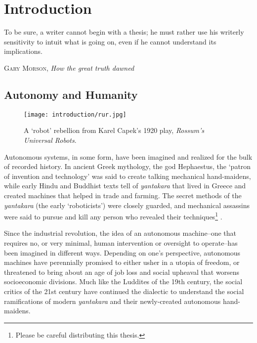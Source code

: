 \chapter{Introduction}
\label{ch:intro}
\epigraph{To be sure, a writer cannot begin with a thesis; he must rather use his writerly sensitivity to intuit what is going on, even if he cannot understand its implications.}{\textsc{Gary Morson}, \textit{How the great truth dawned}}
 

\section{Autonomy and Humanity}
\begin{wrapfigure}{r}{0.5\textwidth}
  \begin{center}
  	\vspace{-20pt}
    \texttt{[image: introduction/rur.jpg]}
     \vspace{-15pt}
  \end{center}
  \caption{A `robot' rebellion from Karel Capek's 1920 play, \textit{Rossum's Universal Robots}.}
  \vspace{-5pt}
  \label{fig:into_rur}
\end{wrapfigure}

Autonomous systems, in some form, have been imagined and realized for the bulk of recorded history. In ancient Greek mythology, the god Hephaestus, the `patron of invention and technology' \citep{MayorGodsRobots2019} was said to create talking mechanical hand-maidens, while early Hindu and Buddhist texts tell of \textit{yantakara} that lived in Greece and created machines that helped in trade and farming. The secret methods of the \textit{yantakara} (the early `roboticists') were closely guarded, and mechanical assassins were said to pursue and kill any person who revealed their techniques\footnote{Please be careful distributing this thesis.} \citep{MayorGodsRobots2019}. 


Since the industrial revolution, the idea of an autonomous machine--one that requires no, or very minimal, human intervention or oversight to operate--has been imagined in different ways. Depending on one's perspective, autonomous machines have perennially promised to either usher in a utopia of freedom, or threatened to bring about an age of job loss and social upheaval that worsens socioeconomic divisions. Much like the Luddites of the 19th century, the social critics of the 21st century have continued the dialectic to understand the social ramifications of modern \textit{yantakara} and their newly-created autonomous hand-maidens.

